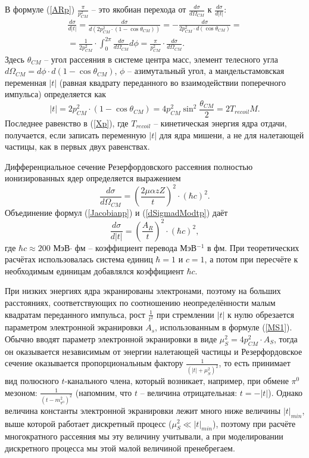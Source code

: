 \documentclass[a4paper,12pt]{article}
\begin{document}
\begin{large}
  В формуле (\ref{ARp}) $\frac{\pi}{p_{CM}^2}$ -- это якобиан перехода от $\frac{d\sigma}{d\Omega_{CM}}$ к $\frac{d\sigma}{d|t|}$:
\begin{multline}
  \label{Jacobianp}
\frac{d\sigma}{d|t|}=\frac{d\sigma}{d(2p_{CM}^2 \cdot (1-\cos{\theta_{CM}}))}=-\frac{d\sigma}{2p_{CM}^2 \cdot d(\cos{\theta_{CM}})}= \\ =\frac{1}{2p_{CM}^2} \cdot \int_0^{2\pi} \frac{d\sigma}{d\Omega_{CM}} d\phi=\frac{\pi}{p_{CM}^2} \cdot \frac{d\sigma}{d\Omega_{CM}}.
\end{multline}
Здесь $\theta_{CM}$ -- угол рассеяния в системе центра масс, элемент телесного угла $d\Omega_{CM}=d\phi \cdot d(1-\cos{\theta_{CM}})$, $\phi$ -- азимутальный угол, а мандельстамовская переменная $|t|$ (равная квадрату переданного во взаимодействии поперечного импульса) определяется как
\begin{equation}
 \label{Xp} 
|t|=2p_{CM}^2 \cdot (1-\cos\theta_{CM})=4p_{CM}^2 \sin^2\frac{\theta_{CM}}{2}=2T_{recoil}M.
\end{equation}
Последнее равенство в (\ref{Xp}), где $T_{recoil}$ -- кинетическая энергия ядра отдачи, получается, если записать переменную $|t|$ для ядра мишени, а не для налетающей частицы, как в первых двух равенствах.

Дифференциальное сечение Резерфордовского рассеяния полностью ионизированных ядер определяется выражением \cite{LandauLifshitzMechanics}
\begin{equation}
  \label{dSigmadModtp}
  \frac{d\sigma}{d\Omega_{CM}}=\left( \frac{2 \mu \alpha z Z}{t} \right)^2 \cdot \left( \hbar c \right)^2.
\end{equation}
Объединение формул (\ref{Jacobianp}) и (\ref{dSigmadModtp}) даёт
\begin{equation}
  \label{Dimension1p}
  \frac{d\sigma}{d|t|}=\left( \frac{A_R}{t} \right)^2 \cdot \left( \hbar c\right)^2,
\end{equation}
где $\hbar c\approx 200$ МэВ$\cdot$ фм -- коэффициент перевода МэВ$^{-1}$ в фм.
  При теоретических расчётах использовалась система единиц $\hbar=1$ и $c=1$, а потом при пересчёте к необходимым единицам добавлялся коэффициент $\hbar c$.

  При низких энергиях ядра экранированы электронами, поэтому на больших расстояниях, соответствующих по соотношению неопределённости малым квадратам переданного импульса, рост $\frac{1}{t^2}$ при стремлении $|t|$ к нулю обрезается параметром электронной экранировки $A_s$, использованным  в формуле (\ref{MS1}).
  Обычно вводят параметр электронной экранировки в виде $\mu^2_S=4p^2_{CM}\cdot A_S$, тогда он оказывается независимым от энергии налетающей частицы и Резерфордовское сечение оказывается пропорциональным фактору $\frac{1}{(|t|+\mu^2_S)^2}$, то есть принимает вид полюсного $t$-канального члена, который возникает, например, при обмене $\pi^0$ мезоном: $\frac{1}{(t-m_{\pi^0}^2)^2}$ (напомним, что $t$ -- величина отрицательная: $t=-|t|$).
 Однако величина константы электронной экранировки лежит много ниже величины $|t|_{min}$, выше которой работает дискретный процесс ($\mu^2_S \ll |t|_{min}$), поэтому при расчёте многократного рассеяния мы эту величину учитывали, а при моделировании дискретного процесса мы этой малой величиной пренебрегаем.


\end{large}
\end{document}
